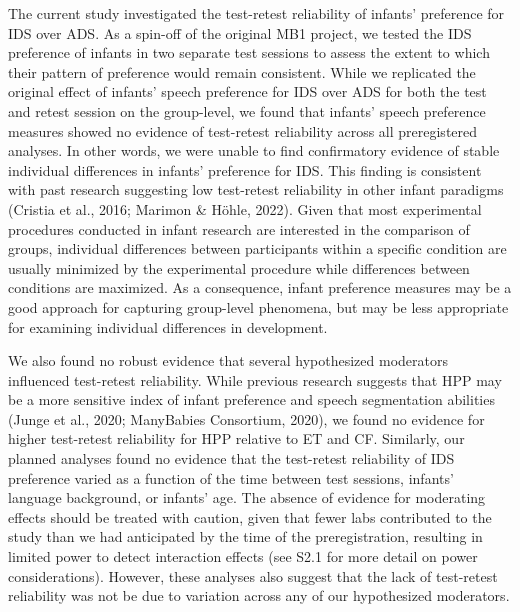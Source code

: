 \documentclass[
  man,floatsintext]{apa6}
\begin{document}
The current study investigated the test-retest reliability of infants' preference for IDS over ADS.
As a spin-off of the original MB1 project, we tested the IDS preference of infants in two separate test sessions to assess the extent to which their pattern of preference would remain consistent.
While we replicated the original effect of infants' speech preference for IDS over ADS for both the test and retest session on the group-level, we found that infants' speech preference measures showed no evidence of test-retest reliability across all preregistered analyses.
In other words, we were unable to find confirmatory evidence of stable individual differences in infants' preference for IDS.
This finding is consistent with past research suggesting low test-retest reliability in other infant paradigms (Cristia et al., 2016; Marimon \& Höhle, 2022).
Given that most experimental procedures conducted in infant research are interested in the comparison of groups, individual differences between participants within a specific condition are usually minimized by the experimental procedure while differences between conditions are maximized.
As a consequence, infant preference measures may be a good approach for capturing group-level phenomena, but may be less appropriate for examining individual differences in development.

We also found no robust evidence that several hypothesized moderators influenced test-retest reliability.
While previous research suggests that HPP may be a more sensitive index of infant preference and speech segmentation abilities (Junge et al., 2020; ManyBabies Consortium, 2020), we found no evidence for higher test-retest reliability for HPP relative to ET and CF.
Similarly, our planned analyses found no evidence that the test-retest reliability of IDS preference varied as a function of the time between test sessions, infants' language background, or infants' age.
The absence of evidence for moderating effects should be treated with caution, given that fewer labs contributed to the study than we had anticipated by the time of the preregistration, resulting in limited power to detect interaction effects (see S2.1 for more detail on power considerations).
However, these analyses also suggest that the lack of test-retest reliability was not be due to variation across any of our hypothesized moderators.
\end{document}
